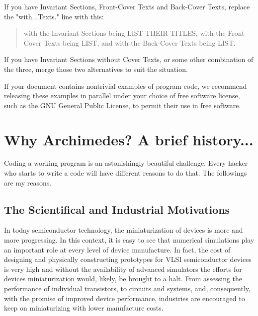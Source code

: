 \documentclass[12pt]{book}
\begin{document}
If you have Invariant Sections, Front-Cover Texts and Back-Cover Texts,
replace the "with...Texts." line with this:

\bigskip
\begin{quote}
    with the Invariant Sections being LIST THEIR TITLES, with the
    Front-Cover Texts being LIST, and with the Back-Cover Texts being LIST.
\end{quote}
\bigskip
    
If you have Invariant Sections without Cover Texts, or some other
combination of the three, merge those two alternatives to suit the
situation.

If your document contains nontrivial examples of program code, we
recommend releasing these examples in parallel under your choice of
free software license, such as the GNU General Public License,
to permit their use in free software.







\chapter{Why \textbf{Archimedes}? A brief history...}

Coding a working program is an astonishingly beautiful challenge. Every hacker who starts to write a code will have different reasons to do that. The followings are my reasons.

\section{The Scientifical and Industrial Motivations}

In today semiconductor technology, the miniaturization of devices is more and more progressing. In this context, it is easy to see that numerical simulations play an important role at every level of device manufacture. In fact, the cost of designing and physically constructing prototypes for VLSI semiconductor devices is very high and without the availability of advanced simulators the efforts for devices miniaturization would, likely, be brought to a halt. From assessing the performance of individual transistors, to circuits and systems, and, consequently, with the promise of improved device performance, industries are encouraged to keep on miniaturizing with lower manufacture costs.
\end{document}
